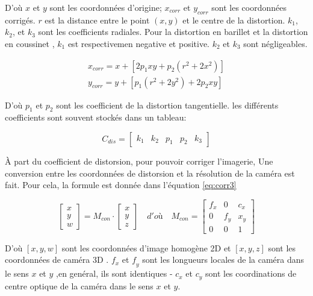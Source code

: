 \documentclass[
]{article}
\begin{document}
D'où \(𝑥\) et \(𝑦\) sont les coordonnées d'origine; \(x_{𝑐𝑜𝑟𝑟}\) et
\(y_{𝑐𝑜𝑟𝑟}\) sont les coordonnées corrigés. \(𝑟\) est la distance entre le
point \(\left(𝑥, 𝑦\right)\) et le centre de la distortion. \(𝑘_1\), \(𝑘_2\),
et \(𝑘_3\) sont les coefficients radiales. Pour la distortion en barillet et la distortion en coussinet , \(𝑘_1\) est respectivemen negative et positive. \(𝑘_2\) et \(𝑘_3\) sont négligeables.

\begin{equation}
\begin{aligned}
   x_{corr} = x+\left[ 2 p_1 x y+ p_2\left( r^2+2x^2\right) \right]\\
  y_{corr} = y+\left[ p_1 \left(r^2+2 y^2\right)+ 2p_2xy\right]
\end{aligned}
 \label{eq:corr2}
\end{equation}

D'où \(𝑝_1\) et \(𝑝_2\) sont les coefficient de la distortion tangentielle. les différents coefficients sont souvent stockés dans un tableau:

\begin{equation}
C_{dis}=
\begin{bmatrix}
k_1 & k_2 & p_1 & p_2 & k_3
\end{bmatrix}
\end{equation}

À part du coefficient de distorsion, pour pouvoir corriger l'imagerie, Une conversion entre les coordonnées de distorsion et la résolution de la caméra est
fait. Pour cela, la formule est donnée dans l'équation \eqref{eq:corr3}

\begin{equation}
\begin{bmatrix}
x\\
y\\
w
\end{bmatrix}
= M_{con} \cdot
\begin{bmatrix}
x\\
y\\
z
\end{bmatrix}
\quad d'où \quad
M_{con} =
\begin{bmatrix}
f_x & 0 & c_x\\
0 & f_y & x_y\\
0 & 0 &1
\end{bmatrix}
\label{eq:corr3}
\end{equation}

D'où \([𝑥, 𝑦, 𝑤]\) sont les coordonnées d'image homogène 2D et \([x, y , z]\) sont les coordonnées de caméra 3D . \(f_𝑥\) et \(𝑓_𝑦\) sont les longueurs locales de la caméra dans le sens \(𝑥\) et \(𝑦\) ,en genéral, ils sont identiques - \(𝑐_𝑥\) et \(𝑐_𝑦\) sont les coordinations de centre optique de la caméra dans le sens \(𝑥\) et \(𝑦\).
\end{document}
